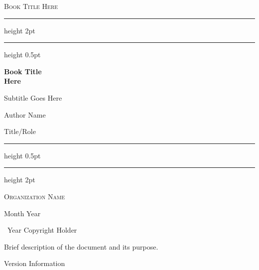 \documentclass[11pt,letterpaper,openany,oldfontcommands]{memoir}
\begin{document}
\frontmatter

\begin{titlingpage}
\thispagestyle{empty}
\vspace*{0.3\textheight}
\begin{center}
{\Large\sffamily\scshape Book Title Here}
\end{center}
\vfill
\end{titlingpage}

\begin{titlingpage}
\thispagestyle{empty}
\centering
\vspace*{1.5cm}

{\color{RoyalBlue!60!black}\hrule height 2pt}
\vspace{0.5cm}
{\color{RoyalBlue!40!black}\hrule height 0.5pt}

\vspace{2cm}

{\fontsize{32}{38}\selectfont\sffamily\bfseries Book Title\\[0.3em] Here\par}

\vspace{1.2cm}

{\Large\sffamily\color{gray!70!black} Subtitle Goes Here\par}

\vspace{3cm}

{\large\sffamily Author Name\par}
{\normalsize\sffamily\color{gray!60!black} Title/Role\par}

\vfill

{\color{RoyalBlue!40!black}\hrule height 0.5pt}
\vspace{0.5cm}
{\color{RoyalBlue!60!black}\hrule height 2pt}

\vspace{1cm}

{\large\sffamily\scshape Organization Name\par}
\vspace{0.3cm}
{\normalsize\sffamily Month Year\par}

\end{titlingpage}

\clearpage
\thispagestyle{empty}
\vspace*{\fill}
\begin{center}
{\small\sffamily\textcopyright\ Year Copyright Holder}
\vspace{2em}

\begin{minipage}{0.7\textwidth}
\centering\small
Brief description of the document and its purpose.
\end{minipage}

\vspace{3em}
{\footnotesize\color{gray} Version Information}
\end{center}
\vspace*{\fill}
\end{document}
